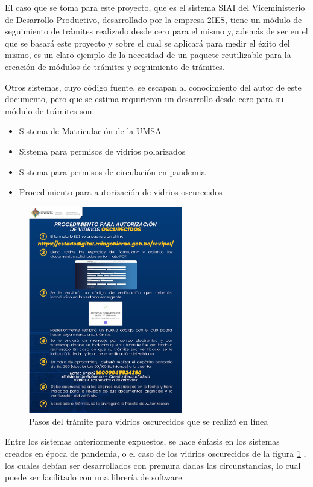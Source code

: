 El caso que se toma para este proyecto, que es el sistema SIAI del Viceministerio de Desarrollo Productivo, desarrollado por la empresa 2IES, tiene un módulo de seguimiento de trámites realizado desde cero para el mismo y, además de ser en el que se basará este proyecto y sobre el cual se aplicará para medir el éxito del mismo, es un claro ejemplo de la necesidad de un paquete reutilizable para la creación de módulos de trámites y seguimiento de trámites.

Otros sistemas, cuyo código fuente, se escapan al conocimiento del autor de este documento, pero que se estima requirieron un desarrollo desde cero para su módulo de trámites son:
\begin{itemize}
    \item Sistema de Matriculación de la UMSA
    \item Sistema para permisos de vidrios polarizados
    \item Sistema para permisos de circulación en pandemia
    \item Procedimiento para autorización de vidrios oscurecidos
\end{itemize}

\begin{figure}[h]
    \centering
    \includegraphics[width=0.6\textwidth]{assets/tramiteoscurecidos.jpg}
    \caption{Pasos del trámite para vidrios oscurecidos que se realizó en línea}
    \label{fig:polarized_procedure_steps}
\end{figure}

Entre los sistemas anteriormente expuestos, se hace énfasis en los sistemas creados en época de pandemia, o el caso de los vidrios oscurecidos de la figura \ref{fig:polarized_procedure_steps} , los cuales debían ser desarrollados con premura dadas las circunstancias, lo cual puede ser facilitado con una librería de software.

